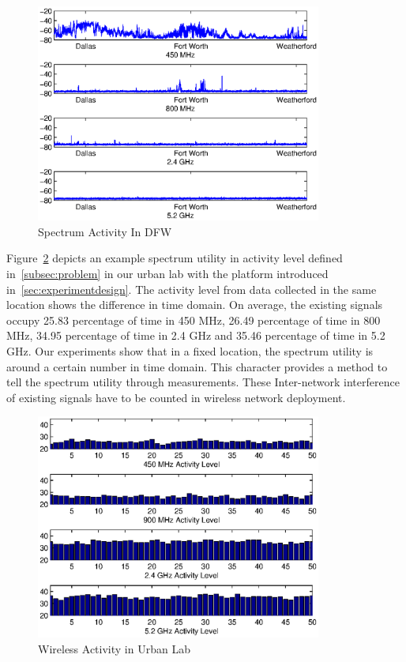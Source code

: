    
   \begin{figure}
   \centering
   \includegraphics[width=94mm]{figures/drivetest}
   \vspace{-0.1in}
   \caption{Spectrum Activity In DFW}                                                                 
   \label{fig:drivetest}
   \vspace{-0.1in}
   \end{figure}

Figure~\ref{fig:labact} depicts an example spectrum utility in activity level
defined in~\ref{subsec:problem} in our urban lab with the platform introduced 
in~\ref{sec:experimentdesign}. 
The activity level from data collected in the same location shows 
the difference in time domain. On average, the existing signals occupy 25.83 
percentage of time in 450 MHz, 26.49 percentage of time in 800 MHz, 
34.95 percentage of time in 2.4 GHz and 35.46 percentage of time in 5.2 GHz. 
Our experiments show that in a fixed location, the spectrum utility is around
a certain number in time domain. This character provides a method to tell
the spectrum utility through measurements. These Inter-network interference 
of existing signals have to be counted in wireless network deployment. 

   \begin{figure}
   \centering
   \includegraphics[width=94mm]{figures/labactivity}
   \vspace{-0.1in}
   \caption{Wireless Activity in Urban Lab}                                                                 
   \label{fig:labact}
   \vspace{-0.1in}
   \end{figure}
   
